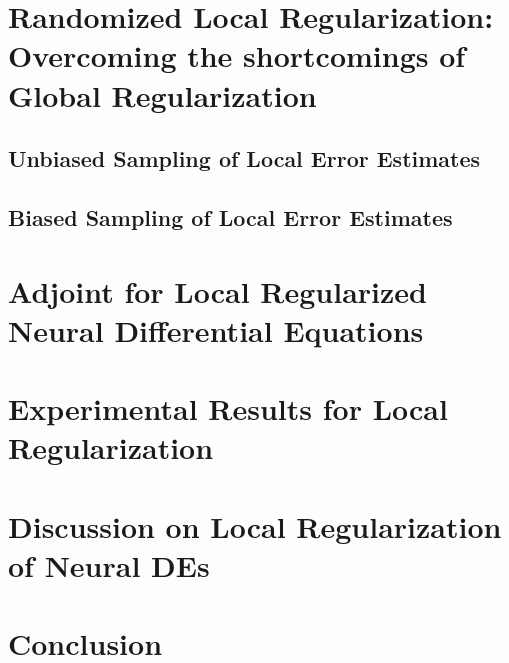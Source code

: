 \section{Randomized Local Regularization: Overcoming the shortcomings of Global Regularization}
\label{sec:randomized_local_regularization_overcoming_the_shortcomings_of_global_regularization}

\subsection{Unbiased Sampling of Local Error Estimates}
\label{subsec:unbiased_sampling_of_local_error_estimates}

\subsection{Biased Sampling of Local Error Estimates}
\label{subsec:biased_sampling_of_local_error_estimates}

\section{Adjoint for Local Regularized Neural Differential Equations}
\label{sec:adjoint_for_local_regularized_neural_differential_equations}

\section{Experimental Results for Local Regularization}
\label{sec:experimental_results_local_regularized_neural_des}

\section{Discussion on Local Regularization of Neural DEs}
\label{sec:discussion_on_local_regularization_of_neural_des}

\section{Conclusion}
\label{sec:conclusion}
